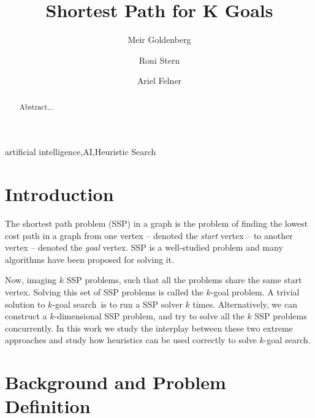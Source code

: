 \documentclass{aicom2e}
\newcommand{\kgs}{$k$-goal search}
\begin{document}
\begin{frontmatter}                           %
%
\title{Shortest Path for K Goals}
\maketitle
%
\author[]{Meir Goldenberg}
\address{Lev Academic Center\\ Jerusalem, Israel\\
	E-mail: mgoldenbe@gmail.com}
\author[]{Roni Stern}
\address{Ben Gurion University of the Negev\\ Be'er Sheva, Israel\\
E-mail: roni.stern@gmail.com}
\author[]{Ariel Felner}
\address{Ben Gurion University of the Negev\\ Be'er Sheva, Israel\\
	E-mail: felner@bgu.ac.il}

\begin{abstract}
Abstract...

\end{abstract}

\begin{keyword}
artificial intelligence\sep AI\sep Heuristic Search
\end{keyword}
%
\end{frontmatter}

\section*{Introduction}


The shortest path problem (SSP) in a graph is the problem of finding the lowest cost path in a graph from one vertex -- denoted the {\em start} vertex -- to another vertex -- denoted the {\em goal} vertex. 
SSP is a well-studied problem and many algorithms have been proposed for solving it. 

Now, imaging $k$ SSP problems, such that all the problems share the same start vertex. 
Solving this set of SSP problems is called the $k$-goal problem. 
A trivial solution to \kgs\ is to run a SSP solver $k$ times. Alternatively, 
we can construct a $k$-dimensional SSP problem, and try to solve all the $k$ SSP problems concurrently. 
In this work we study the interplay between these two extreme approaches and
study how heuristics can be used correctly to solve \kgs. 

\section{Background and Problem Definition}
\end{document}
